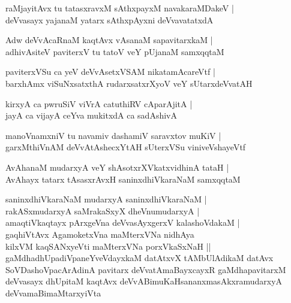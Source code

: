 \documentclass[twoside,12pt,openright]{book}
\newcounter{shloka}[chapter]
\begin{document}
\begin{shloka}%
raMjayitAvx tu tatasxravxM sAthxpayxM navakaraMDakeV |\\
deVvasayx yajanaM yatarx sAthxpAyxni deVvavatatxdA 
\end{shloka}

\begin{shloka}%
Adw deVvAcaRnaM kaqtAvx vAsanaM sapavitarxkaM |\\
adhivAsiteV paviterxV tu tatoV veY pUjanaM samxqqtaM 
\end{shloka}

\begin{shloka}%
paviterxVSu ca yeV deVvAsetxVSAM nikatamAcareVtf |\\
barxhAmx viSuNxsatxthA rudarxsatxrXyoV veY sUtarxdeVvatAH 
\end{shloka}

\begin{shloka}%
kirxyA ca pwruSiV viVrA catuthiRV cAparAjitA |\\
jayA ca vijayA ceYva mukitxdA ca sadAshivA 
\end{shloka}

\begin{shloka}%
manoVnamxniV tu navamiv dashamiV saravxtov muKiV |\\
garxMthiVnAM deVvAtAshecxYtAH sUterxVSu viniveVshayeVtf
\end{shloka}

\begin{shloka}%
AvAhanaM mudarxyA veY shAsotxrXVkatxvidhinA tataH |\\
AvAhayx tatarx tAsasxrAvxH saninxdhiVkaraNaM samxqqtaM 
\end{shloka}

\begin{shloka}%
saninxdhiVkaraNaM mudarxyA saninxdhiVkaraNaM |\\
rakASxmudarxyA saMrakaSxyX dheVnumudarxyA |\\
amaqtiVkaqtayx pArxgeVna deVvasAyxgerxV kalashoVdakaM |\\
gaqhiVtAvx AgamoketxVna maMterxVNa nidhAya \\
kilxVM kaqSANxyeVti maMterxVNa porxVkaSxNaH ||\\
gaMdhadhUpadiVpaneYveVdayxkaM datAtxvX tAMbUlAdikaM datAvx \\
SoVDashoVpacArAdinA pavitarx deVvatAmaBayxcayxR gaMdhapavitarxM \\
deVvasayx dhUpitaM kaqtAvx deVvABimuKaHsananxmasAkxramudarxyA \\
deVvamaBimaMtarxyiVta\\
\end{shloka}
\end{document}
